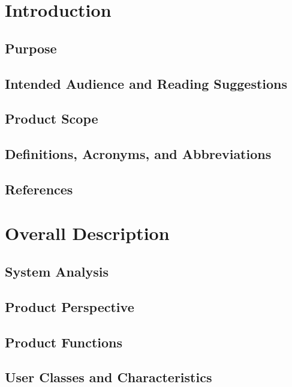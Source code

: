 \documentclass[11pt]{article}
\begin{document}
\section{Introduction}
\label{sec:introduction}

\subsection{Purpose}
\label{sec:purpose}

\subsection{Intended Audience and Reading Suggestions}
\label{sec:audience}

\subsection{Product Scope}
\label{sec:scope}

\subsection{Definitions, Acronyms, and Abbreviations}
\label{sec:definitions}

\subsection{References}
\label{sec:references}

\section{Overall Description}
\label{sec:overall}

\subsection{System Analysis}
\label{sec:analysis}

\subsection{Product Perspective}
\label{sec:perspective}

\subsection{Product Functions}
\label{sec:functions}

\subsection{User Classes and Characteristics}
\label{sec:classes}
\end{document}
